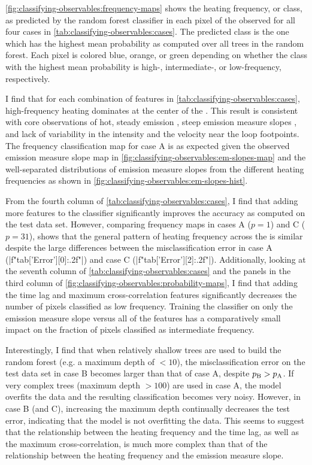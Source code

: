 \autoref{fig:classifying-observables:frequency-maps} shows the heating frequency, or class, as predicted by the random forest classifier in each pixel of the observed \AR{} for all four cases in \autoref{tab:classifying-observables:cases}. The predicted class is the one which has the highest mean probability as computed over all trees in the random forest. Each pixel is colored blue, orange, or green depending on whether the class with the highest mean probability is high-, intermediate-, or low-frequency, respectively.

I find that for each combination of features in \autoref{tab:classifying-observables:cases}, high-frequency heating dominates at the center of the \AR{}. This result is consistent with \AR{} core observations of hot, steady emission \citep{warren_evidence_2010,warren_constraints_2011}, steep emission measure slopes \citep[e.g.][]{winebarger_using_2011,del_zanna_evolution_2015}, and lack of variability in the intensity \citep[e.g.][]{antiochos_constraints_2003} and the velocity \citep{brooks_flows_2009} near the loop footpoints. The frequency classification map for case A is as expected given the observed emission measure slope map in \autoref{fig:classifying-observables:em-slopes-map} and the well-separated distributions of emission measure slopes from the different heating frequencies as shown in \autoref{fig:classifying-observables:em-slopes-hist}.

From the fourth column of \autoref{tab:classifying-observables:cases}, I find that adding more features to the classifier significantly improves the accuracy as computed on the test data set. However, comparing frequency maps in cases A ($p=1$) and C ($p=31$), shows that the general pattern of heating frequency across the \AR{} is similar despite the large differences between the misclassification error in case A (|f"{tab['Error'][0]:.2f}"|) and case C (|f"{tab['Error'][2]:.2f}"|). Additionally, looking at the seventh column of \autoref{tab:classifying-observables:cases} and the panels in the third column of \autoref{fig:classifying-observables:probability-maps}, I find that adding the time lag and maximum cross-correlation features significantly decreases the number of pixels classified as low frequency. Training the classifier on only the emission measure slope versus all of the features has a comparatively small impact on the fraction of pixels classified as intermediate frequency.

Interestingly, I find that when relatively shallow trees are used to build the random forest (e.g. a maximum depth of $<10$), the misclassification error on the test data set in case B becomes larger than that of case A, despite $p_\textup{B}>p_\textup{A}$. If very complex trees (maximum depth $>100$) are used in case A, the model overfits the data and the resulting classification becomes very noisy. However, in case B (and C), increasing the maximum depth continually decreases the test error, indicating that the model is not overfitting the data. This seems to suggest that the relationship between the heating frequency and the time lag, as well as the maximum cross-correlation, is much more complex than that of the relationship between the heating frequency and the emission measure slope.

